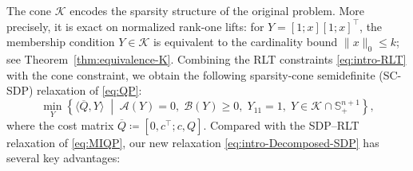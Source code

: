 \documentclass[11pt]{article}
\def\A{\mathcal{A}}
\def\B{\mathcal{B}}
\def\K{\mathcal{K}}
\def\S{\mathbb{S}}
\def\bQ{\overline{Q}}
\theoremstyle{plain}
\begin{document}
The cone $\K$ encodes the sparsity structure of the original problem. More precisely, it is exact on normalized rank-one lifts: for $Y=[1;x][1;x]^\top$, the membership condition $Y\in\K$ is equivalent to the cardinality bound $\|x\|_0\le k$; see Theorem~\ref{thm:equivalence-K}.
Combining the RLT constraints \eqref{eq:intro-RLT} with the cone constraint, we obtain the following sparsity-cone semidefinite (SC-SDP) relaxation of \eqref{eq:QP}:
\begingroup
\renewcommand{\theequation}{Q}
\begin{equation}
\label{eq:intro-Decomposed-SDP}
\min_{Y}\left\{
\langle \bQ,Y \rangle  \;\middle|\;  
 \A(Y)=0,\; \B(Y)\geq 0,\; 
Y_{11}=1,\;
 Y\in \K\cap \S^{n+1}_+
\right\},\tag{Q}
\end{equation}
\endgroup
where the cost matrix $\bQ\coloneqq [ 0, c^\top; c, Q]$. 
Compared with the SDP--RLT relaxation of \eqref{eq:MIQP}, 
our new relaxation \eqref{eq:intro-Decomposed-SDP} has several key advantages:
\end{document}
